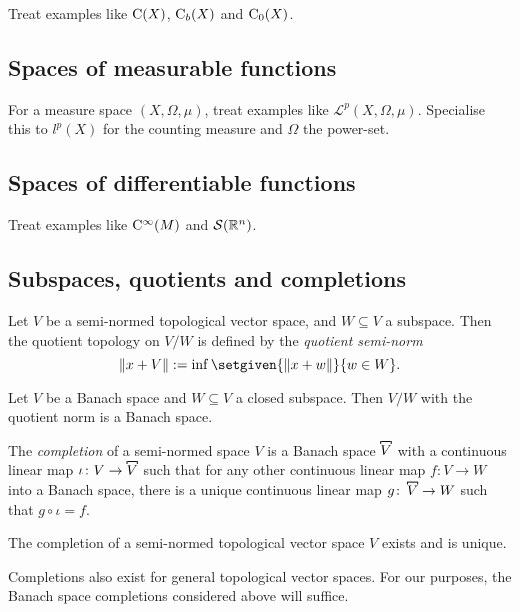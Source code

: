   Treat examples like \(\mathrm{C}(X)\), \(\mathrm{C}_b(X)\) and \(\mathrm{C}_0(X)\). 

\subsection{Spaces of measurable functions}

For a measure space \((X,\Omega, \mu)\), treat examples like \(\mathcal{L}^p(X,\Omega,\mu)\). Specialise this to \(l^p(X)\) for the counting measure and \(\Omega\) the power-set. 

\subsection{Spaces of differentiable functions}

Treat examples like \(\mathrm{C}^\infty(M)\) and \(\mathcal{S}(\mathbb R^n)\).

\subsection{Subspaces, quotients and completions}


Let \(V\) be a semi-normed topological vector space, and \(W \subseteq V\) a subspace. Then the quotient topology on \(V/W\) is defined by the \textit{quotient semi-norm} \[\norm{x + V} \defeq \inf \setgiven{\norm{x+ w}}{w \in W}.\]

\begin{theorem}
Let \(V\) be a Banach space and \(W \subseteq V\) a closed subspace. Then \(V/W\) with the quotient norm is a Banach space. 
\end{theorem}


\begin{definition}\label{def:completion}
The \textit{completion} of a semi-normed space \(V\) is a Banach space \(\comb{V}\) with a continuous linear map \(\iota \colon V \to \comb{V}\) such that for any other continuous linear map \(f \colon V \to W\) into a Banach space, there is a unique continuous linear map \(g \colon \comb{V} \to W\) such that \(g \circ \iota = f\). 
\end{definition}


\begin{theorem}
The completion of a semi-normed topological vector space \(V\) exists and is unique. 
\end{theorem}


Completions also exist for general topological vector spaces. For our purposes, the Banach space completions considered above will suffice. 

